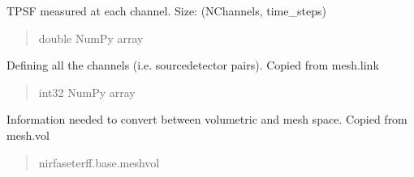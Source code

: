 \documentclass[letterpaper,10pt,english]{sphinxmanual}
\begin{document}
\begin{fulllineitems}
\begin{fulllineitems}
\begin{quote}
\begin{description}
\end{description}\end{quote}

\end{fulllineitems}


\begin{fulllineitems}
\label{\detokenize{_autosummary/nirfasterff.base.data.TPSFdata:nirfasterff.base.data.TPSFdata.tpsf}}
\pysigstartsignatures
\pysigline
{}
\pysigstopsignatures
\sphinxAtStartPar
TPSF measured at each channel. Size: (NChannels, time\_steps)
\begin{quote}\begin{description}
\sphinxAtStartPar
double NumPy array

\end{description}\end{quote}

\end{fulllineitems}


\begin{fulllineitems}
\label{\detokenize{_autosummary/nirfasterff.base.data.TPSFdata:nirfasterff.base.data.TPSFdata.link}}
\pysigstartsignatures
\pysigline
{}
\pysigstopsignatures
\sphinxAtStartPar
Defining all the channels (i.e. source\sphinxhyphen{}detector pairs). Copied from mesh.link
\begin{quote}\begin{description}
\sphinxAtStartPar
int32 NumPy array

\end{description}\end{quote}

\end{fulllineitems}


\begin{fulllineitems}
\label{\detokenize{_autosummary/nirfasterff.base.data.TPSFdata:nirfasterff.base.data.TPSFdata.vol}}
\pysigstartsignatures
\pysigline
{}
\pysigstopsignatures
\sphinxAtStartPar
Information needed to convert between volumetric and mesh space. Copied from mesh.vol
\begin{quote}\begin{description}
\sphinxAtStartPar
nirfaseterff.base.meshvol


\end{description}
\end{quote}
\end{fulllineitems}
\end{fulllineitems}
\end{document}
